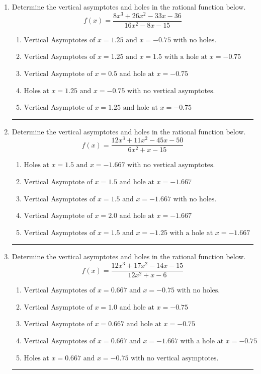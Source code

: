 \documentclass[14pt]{extbook}
\newcommand{\litem}[1]{\item#1\hspace*{-1cm}\rule{\textwidth}{0.4pt}}
\begin{document}
\begin{enumerate}
\litem{
Determine the vertical asymptotes and holes in the rational function below.\[ f(x) = \frac{8x^{3} +26 x^{2} -33 x -36}{16x^{2} -8 x -15} \]\begin{enumerate}[label=\Alph*.]
\item \( \text{Vertical Asymptotes of } x = 1.25 \text{ and } x = -0.75 \text{ with no holes.} \)
\item \( \text{Vertical Asymptotes of } x = 1.25 \text{ and } x = 1.5 \text{ with a hole at } x = -0.75 \)
\item \( \text{Vertical Asymptote of } x = 0.5 \text{ and hole at } x = -0.75 \)
\item \( \text{Holes at } x = 1.25 \text{ and } x = -0.75 \text{ with no vertical asymptotes.} \)
\item \( \text{Vertical Asymptote of } x = 1.25 \text{ and hole at } x = -0.75 \)

\end{enumerate} }
\litem{
Determine the vertical asymptotes and holes in the rational function below.\[ f(x) = \frac{12x^{3} +11 x^{2} -45 x -50}{6x^{2} +x -15} \]\begin{enumerate}[label=\Alph*.]
\item \( \text{Holes at } x = 1.5 \text{ and } x = -1.667 \text{ with no vertical asymptotes.} \)
\item \( \text{Vertical Asymptote of } x = 1.5 \text{ and hole at } x = -1.667 \)
\item \( \text{Vertical Asymptotes of } x = 1.5 \text{ and } x = -1.667 \text{ with no holes.} \)
\item \( \text{Vertical Asymptote of } x = 2.0 \text{ and hole at } x = -1.667 \)
\item \( \text{Vertical Asymptotes of } x = 1.5 \text{ and } x = -1.25 \text{ with a hole at } x = -1.667 \)

\end{enumerate} }
\litem{
Determine the vertical asymptotes and holes in the rational function below.\[ f(x) = \frac{12x^{3} +17 x^{2} -14 x -15}{12x^{2} +x -6} \]\begin{enumerate}[label=\Alph*.]
\item \( \text{Vertical Asymptotes of } x = 0.667 \text{ and } x = -0.75 \text{ with no holes.} \)
\item \( \text{Vertical Asymptote of } x = 1.0 \text{ and hole at } x = -0.75 \)
\item \( \text{Vertical Asymptote of } x = 0.667 \text{ and hole at } x = -0.75 \)
\item \( \text{Vertical Asymptotes of } x = 0.667 \text{ and } x = -1.667 \text{ with a hole at } x = -0.75 \)
\item \( \text{Holes at } x = 0.667 \text{ and } x = -0.75 \text{ with no vertical asymptotes.} \)


\end{enumerate}}
\end{enumerate}
\end{document}
